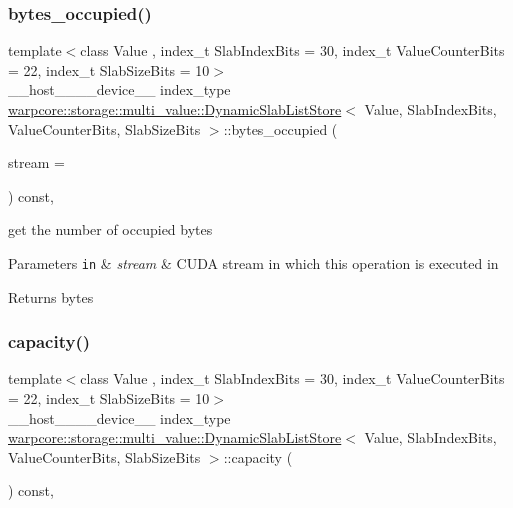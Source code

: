 \subsubsection{\texorpdfstring{bytes\+\_\+occupied()}{bytes\_occupied()}}
{\footnotesize\ttfamily template$<$class Value , index\+\_\+t Slab\+Index\+Bits = 30, index\+\_\+t Value\+Counter\+Bits = 22, index\+\_\+t Slab\+Size\+Bits = 10$>$ \\
\+\_\+\+\_\+host\+\_\+\+\_\+\+\_\+\+\_\+device\+\_\+\+\_\+ index\+\_\+type \hyperlink{classwarpcore_1_1storage_1_1multi__value_1_1DynamicSlabListStore}{warpcore\+::storage\+::multi\+\_\+value\+::\+Dynamic\+Slab\+List\+Store}$<$ Value, Slab\+Index\+Bits, Value\+Counter\+Bits, Slab\+Size\+Bits $>$\+::bytes\+\_\+occupied (\begin{DoxyParamCaption}\item[{cuda\+Stream\+\_\+t}]{stream = {} }\end{DoxyParamCaption}) const\hspace{0.3cm}{\ttfamily [inline]}, {\ttfamily [noexcept]}}



get the number of occupied bytes 


\begin{DoxyParams}[1]{Parameters}
\mbox{\tt in}  & {\em stream} & C\+U\+DA stream in which this operation is executed in \\
\hline
\end{DoxyParams}
\begin{DoxyReturn}{Returns}
bytes 
\end{DoxyReturn}
\mbox{\label{classwarpcore_1_1storage_1_1multi__value_1_1DynamicSlabListStore_ae1c489e608b429bb34ad138c59aded93}} 
\subsubsection{\texorpdfstring{capacity()}{capacity()}}
{\footnotesize\ttfamily template$<$class Value , index\+\_\+t Slab\+Index\+Bits = 30, index\+\_\+t Value\+Counter\+Bits = 22, index\+\_\+t Slab\+Size\+Bits = 10$>$ \\
\+\_\+\+\_\+host\+\_\+\+\_\+\+\_\+\+\_\+device\+\_\+\+\_\+ index\+\_\+type \hyperlink{classwarpcore_1_1storage_1_1multi__value_1_1DynamicSlabListStore}{warpcore\+::storage\+::multi\+\_\+value\+::\+Dynamic\+Slab\+List\+Store}$<$ Value, Slab\+Index\+Bits, Value\+Counter\+Bits, Slab\+Size\+Bits $>$\+::capacity (\begin{DoxyParamCaption}{ }\end{DoxyParamCaption}) const\hspace{0.3cm}{\ttfamily [inline]}, {\ttfamily [noexcept]}}



